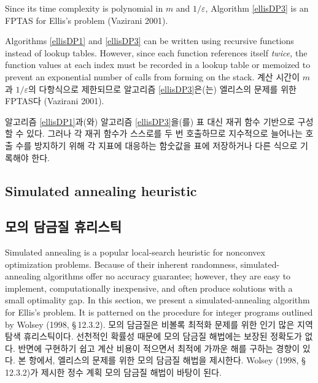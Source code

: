 \documentclass[11pt]{article} %
\theoremstyle{definition}
\theoremstyle{definition}
\begin{document}
\ifen
Since its time complexity is polynomial in $m$ and $1 / \varepsilon$, Algorithm \ref{ellisDP3} is an FPTAS for Ellis's problem (Vazirani 2001). 

Algorithms \ref{ellisDP1} and \ref{ellisDP3} can be written using recursive functions instead of lookup tables. However, since each function references itself \emph{twice,} the function values at each index must be recorded in a lookup table or memoized to prevent an exponential number of calls from forming on the stack.
\else
계산 시간이 $m$과 $1 / \varepsilon$의 다항식으로 제한되므로  알고리즘 \ref{ellisDP3}은(는) 엘리스의 문제를 위한 FPTAS다 (Vazirani 2001). 

알고리즘 \ref{ellisDP1}과(와) 알고리즘 \ref{ellisDP3}을(를) 표 대신 재귀 함수 기반으로 구성할 수 있다. 그러나 각 재귀 함수가 스스로를 두 번 호출하므로 지수적으로 늘어나는 호출 수를 방지하기 위해 각 지표에 대응하는 함숫값을 표에 저장하거나 다른 식으로 기록해야 한다.
\fi


\ifen \subsection{Simulated annealing heuristic} \else \subsection{모의 담금질 휴리스틱}\fi\label{numericalexperiments}
\ifen
Simulated annealing is a popular local-search heuristic for nonconvex optimization problems. Because of their inherent randomness, simulated-annealing algorithms offer no accuracy guarantee; however, they are easy to implement, computationally inexpensive, and often produce solutions with a small optimality gap. In this section, we present a simulated-annealing algorithm for Ellis's problem. It is patterned on the procedure for integer programs outlined by Wolsey (1998, \S\,12.3.2).
\else
모의 담금질은 비볼록 최적화 문제를 위한 인기 많은 지역 탐색 휴리스틱이다. 선천적인 확률성 때문에 모의 담금질 해법에는 보장된 정확도가 없다. 반면에 구현하기 쉽고 계산 비용이 적으면서 최적에 가까운 해를 구하는 경향이 있다. 본 항에서, 엘리스의 문제를 위한 모의 담금질 해법을 제시한다. Wolsey (1998, \S\,12.3.2)가 제시한 정수 계획 모의 담금질 해법이 바탕이 된다.
\fi
\end{document}
